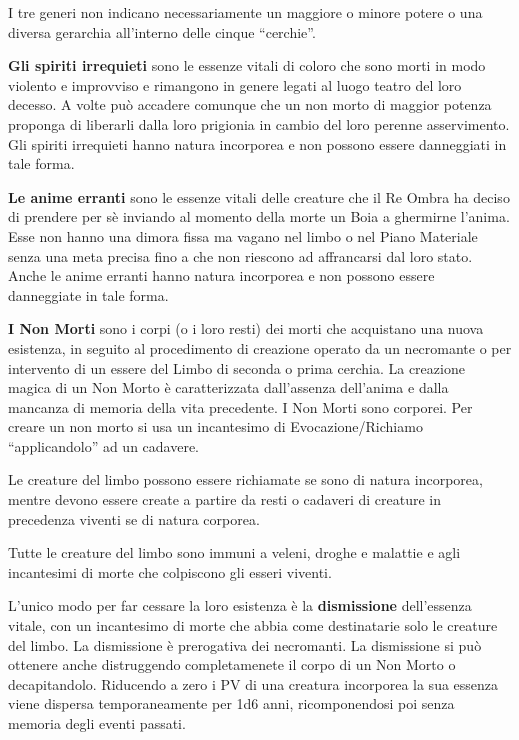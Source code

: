 I tre generi non indicano necessariamente
un maggiore o minore potere o una diversa gerarchia all'interno delle cinque
``cerchie''. 
\begin{description}
\item{\bf Gli spiriti irrequieti} sono le essenze vitali di coloro che sono
morti in modo violento e improvviso e rimangono in genere legati al luogo teatro
del loro decesso. A volte pu\`o accadere comunque che un non morto di maggior
potenza proponga di liberarli dalla loro prigionia in cambio del loro perenne
asservimento. Gli spiriti irrequieti hanno natura incorporea e non possono essere
danneggiati in tale forma. 

\item{\bf Le anime erranti} sono le essenze vitali delle creature
che il Re Ombra ha deciso di prendere per s\`e inviando al momento della morte
un Boia a ghermirne l'anima. Esse non hanno una dimora fissa ma vagano nel limbo
o nel Piano Materiale senza una meta precisa fino a che non riescono ad affrancarsi
dal loro stato. Anche le anime erranti hanno natura incorporea e non possono
essere danneggiate in tale forma. 

\item{\bf I Non Morti} sono i corpi (o i loro resti) dei morti che
  acquistano una nuova esistenza, in seguito al procedimento di
  creazione operato da un necromante o per intervento di un essere del
  Limbo di seconda o prima cerchia. La creazione magica di un Non
  Morto \`e caratterizzata dall'assenza dell'anima e dalla mancanza
  di memoria della vita precedente. I Non Morti sono corporei.  Per
  creare un non morto si usa un incantesimo di Evocazione/Richiamo
  ``applicandolo'' ad un cadavere.

\end{description}

Le creature del limbo possono essere richiamate se sono di natura
incorporea, mentre devono essere create a partire da resti o cadaveri
di creature in precedenza viventi se di natura corporea.

Tutte le creature del limbo sono
immuni a veleni, droghe e malattie e agli incantesimi di morte che
colpiscono gli esseri viventi. 

L'unico modo per far cessare la loro esistenza \`e la
\textbf{dismissione} dell'essenza vitale, con un incantesimo di
morte che abbia come destinatarie solo le creature del limbo. La
dismissione \`e prerogativa dei necromanti. La dismissione si
pu\`o ottenere anche distruggendo completamenete il corpo di un
Non Morto o decapitandolo. Riducendo a zero i PV di una creatura
incorporea la sua essenza viene dispersa temporaneamente per 1d6
anni, ricomponendosi poi senza memoria degli eventi passati.

